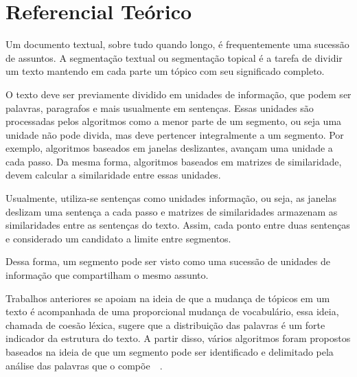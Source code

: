 \section{Referencial Teórico}
	\label{sec:referencial}
	
%
Um documento textual, sobre tudo quando longo, é frequentemente uma sucessão de assuntos. 
%
A segmentação textual ou segmentação topical é a tarefa de dividir um texto mantendo em cada parte um tópico com seu significado completo.
	


%
O texto deve ser previamente dividido em unidades de informação, que podem ser palavras, paragrafos e mais usualmente em sentenças. Essas unidades são processadas pelos algoritmos como a menor parte de um segmento, ou seja uma unidade não pode divida, mas deve pertencer integralmente a um segmento.
%
Por exemplo, algoritmos baseados em janelas deslizantes, avançam uma unidade a cada passo. Da mesma forma, algoritmos baseados em matrizes de similaridade, devem calcular a similaridade entre essas unidades.

%
Usualmente, utiliza-se sentenças como unidades informação, ou seja, as janelas deslizam uma sentença a cada passo e matrizes de similaridades armazenam as similaridades entre as sentenças do texto.
%
Assim, cada ponto entre duas sentenças e considerado um candidato a limite entre segmentos.
  
Dessa forma, um segmento pode ser visto como uma sucessão de unidades de informação que compartilham o mesmo assunto. 



Trabalhos anteriores se apoiam na ideia de que a mudança de tópicos em um texto é acompanhada de uma proporcional mudança de vocabulário, essa ideia, chamada de coesão léxica, sugere que a distribuição das palavras é um forte indicador da estrutura do texto. A partir disso, vários algoritmos foram propostos baseados na ideia de que um segmento pode ser identificado e delimitado pela análise das palavras que o compõe~\cite{Galley2003}~\cite{Boguraev2000}.



